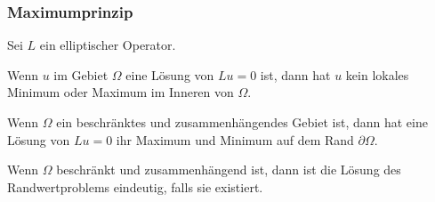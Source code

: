 \begin{frame}
\frametitle{Maximumprinzip}

Sei $L$ ein elliptischer Operator.

\begin{theorem}
Wenn $u$ im Gebiet $\Omega$ eine Lösung von $Lu=0$ ist, dann hat
$u$ kein lokales Minimum oder Maximum im Inneren von $\Omega$.
\end{theorem}

\pause

\begin{theorem}
Wenn $\Omega$ ein beschränktes und zusammenhängendes Gebiet ist,
dann hat eine Lösung von $Lu=0$ ihr Maximum und Minimum auf
dem Rand $\partial \Omega$.
\end{theorem}

\pause

\begin{theorem}
Wenn $\Omega$ beschränkt und zusammenhängend ist, dann ist die
Lösung des Randwertproblems eindeutig, falls sie existiert.
\end{theorem}

\end{frame}

